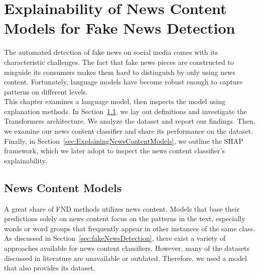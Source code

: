 
\chapter{Explainability of News Content Models for Fake News Detection}\label{chapter:NewsContentModelsForFND}
The automated detection of fake news on social media comes with its characteristic challenges. The fact
that fake news pieces are constructed to misguide its consumers makes them hard to distinguish by only using news content. Fortunately, language models have become robust enough to capture patterns on different levels.\\
This chapter examines a language model, then inspects the model using explanation methods. In Section~\ref{sec:newsContentModels}, we lay out definitions and investigate the Transformers architecture. We analyze the dataset and report our findings. Then, we examine our news content classifier and share its performance on the dataset. Finally, in Section~\ref{sec:ExplainingNewsContentModels}, we outline the SHAP framework, which we later adopt to inspect the news content classifier's explainability.

\section{News Content Models}
\label{sec:newsContentModels}
A great share of FND methods utilizes news content. Models that base their predictions solely on news content focus on the patterns in the text, especially words or word groups that frequently appear in other instances of the same class. As discussed in Section~\ref{sec:fakeNewsDetection}, there exist a variety of approaches available for news content classifiers. However, many of the datasets discussed in literature are unavailable or outdated. Therefore, we used a model that also provides its dataset.

